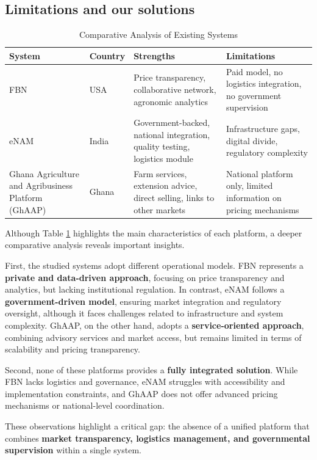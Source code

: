 \subsection{Limitations and our solutions}
\begin{table}[H]
	\centering
	\begin{tabular}{|p{2.5cm}|p{2cm}|p{4.5cm}|p{4cm}|}
		\hline
		\textbf{System} & \textbf{Country} & \textbf{Strengths} & \textbf{Limitations} \\
		\hline
		FBN & USA & Price transparency, collaborative network, agronomic analytics & Paid model, no logistics integration, no government supervision \\
		\hline
		eNAM & India & Government-backed, national integration, quality testing, logistics module & Infrastructure gaps, digital divide, regulatory complexity \\
		\hline
		Ghana Agriculture and Agribusiness Platform (GhAAP) & Ghana & Farm services, extension advice, direct selling, links to other markets & National platform only, limited information on pricing mechanisms \\
		\hline
	\end{tabular}
	\caption{Comparative Analysis of Existing Systems}
	\label{tab:existing-systems}
\end{table}

Although Table \ref{tab:existing-systems} highlights the main characteristics of each platform, a deeper comparative analysis reveals important insights.

First, the studied systems adopt different operational models. FBN represents a \textbf{private and data-driven approach}, focusing on price transparency and analytics, but lacking institutional regulation. In contrast, eNAM follows a \textbf{government-driven model}, ensuring market integration and regulatory oversight, although it faces challenges related to infrastructure and system complexity. GhAAP, on the other hand, adopts a \textbf{service-oriented approach}, combining advisory services and market access, but remains limited in terms of scalability and pricing transparency.

Second, none of these platforms provides a \textbf{fully integrated solution}. While FBN lacks logistics and governance, eNAM struggles with accessibility and implementation constraints, and GhAAP does not offer advanced pricing mechanisms or national-level coordination.

These observations highlight a critical gap: the absence of a unified platform that combines \textbf{market transparency, logistics management, and governmental supervision} within a single system.

